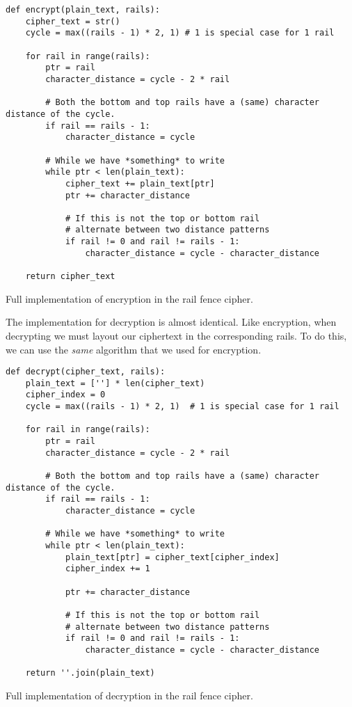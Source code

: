\begin{listing}[H]
    \begin{verbatim}
def encrypt(plain_text, rails):
    cipher_text = str()
    cycle = max((rails - 1) * 2, 1) # 1 is special case for 1 rail
            
    for rail in range(rails):
        ptr = rail
        character_distance = cycle - 2 * rail
                
        # Both the bottom and top rails have a (same) character distance of the cycle. 
        if rail == rails - 1:
            character_distance = cycle
        
        # While we have *something* to write
        while ptr < len(plain_text):
            cipher_text += plain_text[ptr]
            ptr += character_distance
        
            # If this is not the top or bottom rail 
            # alternate between two distance patterns
            if rail != 0 and rail != rails - 1:
                character_distance = cycle - character_distance
        
    return cipher_text
        \end{verbatim}
        \caption{Full implementation of encryption in the rail fence cipher.}
\end{listing}

The implementation for decryption is almost identical. Like encryption, when decrypting we must layout our ciphertext in the corresponding
rails. To do this, we can use the \textit{same} algorithm that we used for encryption. 

\begin{listing}[H]
    \begin{verbatim}
def decrypt(cipher_text, rails):
    plain_text = [''] * len(cipher_text)
    cipher_index = 0
    cycle = max((rails - 1) * 2, 1)  # 1 is special case for 1 rail
    
    for rail in range(rails):
        ptr = rail
        character_distance = cycle - 2 * rail
    
        # Both the bottom and top rails have a (same) character distance of the cycle. 
        if rail == rails - 1:
            character_distance = cycle
    
        # While we have *something* to write
        while ptr < len(plain_text):
            plain_text[ptr] = cipher_text[cipher_index]
            cipher_index += 1
                
            ptr += character_distance
            
            # If this is not the top or bottom rail
            # alternate between two distance patterns  
            if rail != 0 and rail != rails - 1:
                character_distance = cycle - character_distance
    
    return ''.join(plain_text)
        \end{verbatim}
        \caption{Full implementation of decryption in the rail fence cipher.}
\end{listing}

